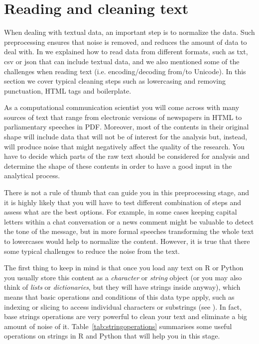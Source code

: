 \section{Reading and cleaning text}
\label{sec:readtext}

When dealing with textual data, an important step is to normalize the data. Such preprocessing ensures that noise is removed, and reduces the amount of data to deal with. In  we explained how to read data from different formats, such as txt, csv or json that can include textual data, and we also mentioned some of the challenges when reading text (i.e. encoding/decoding from/to Unicode). In this section we cover typical cleaning steps such as lowercasing and removing punctuation, HTML tags and boilerplate.
 
As a computational communication scientist you will come across with many sources of text that range from electronic versions of newspapers in HTML to parliamentary speeches in PDF. Moreover, most of the contents in their original shape will include data that will not be of interest for the analysis but, instead,  will produce noise that might negatively affect the quality of the research. You have to decide which parts of the raw text should be considered for analysis and determine the shape of these contents in order to have a good input in the analytical process. 

There is not a rule of thumb that can guide you in this preprocessing stage, and it is highly likely that you will have to test different combination of steps and assess what are the best options. For example, in some cases keeping capital letters within a chat conversation or a news comment might be valuable to detect the tone of the message, but in more formal speeches transforming the whole text to lowercases would help to normalize the content. However, it is true that there some typical challenges to reduce the noise from the text.

The first thing to keep in mind is that once you load any text on R or Python you usually store this content as a \emph{character} or \emph{string} object (or you may also think of \emph{lists} or \emph{dictionaries}, but they will have strings inside anyway), which means that basic operations and conditions of this data type apply, such as indexing or slicing to access individual characters or substrings (see ). In fact, base strings operations are very powerful to clean your text and eliminate a big amount of noise of it.  Table~\ref{tab:stringoperations} summarises some useful operations on strings in R and Python that will help you in this stage.   

